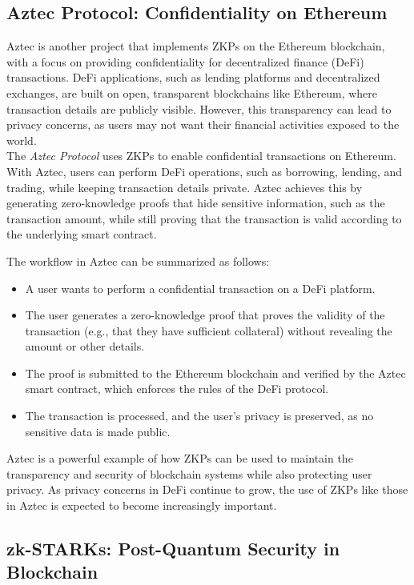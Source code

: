 \subsection{Aztec Protocol: Confidentiality on Ethereum}

Aztec \cite{aztecProtocol} is another project that implements ZKPs on the Ethereum blockchain, with a focus on providing confidentiality for decentralized finance (DeFi) transactions. DeFi applications, such as lending platforms and decentralized exchanges, are built on open, transparent blockchains like Ethereum, where transaction details are publicly visible. However, this transparency can lead to privacy concerns, as users may not want their financial activities exposed to the world.
\\
The \textit{Aztec Protocol} uses ZKPs to enable confidential transactions on Ethereum. With Aztec, users can perform DeFi operations, such as borrowing, lending, and trading, while keeping transaction details private. Aztec achieves this by generating zero-knowledge proofs that hide sensitive information, such as the transaction amount, while still proving that the transaction is valid according to the underlying smart contract.

The workflow in Aztec can be summarized as follows:

\begin{itemize}
    \item A user wants to perform a confidential transaction on a DeFi platform.
    \item The user generates a zero-knowledge proof that proves the validity of the transaction (e.g., that they have sufficient collateral) without revealing the amount or other details.
    \item The proof is submitted to the Ethereum blockchain and verified by the Aztec smart contract, which enforces the rules of the DeFi protocol.
    \item The transaction is processed, and the user’s privacy is preserved, as no sensitive data is made public.
\end{itemize}

Aztec is a powerful example of how ZKPs can be used to maintain the transparency and security of blockchain systems while also protecting user privacy. As privacy concerns in DeFi continue to grow, the use of ZKPs like those in Aztec is expected to become increasingly important.

\subsection{zk-STARKs: Post-Quantum Security in Blockchain}

